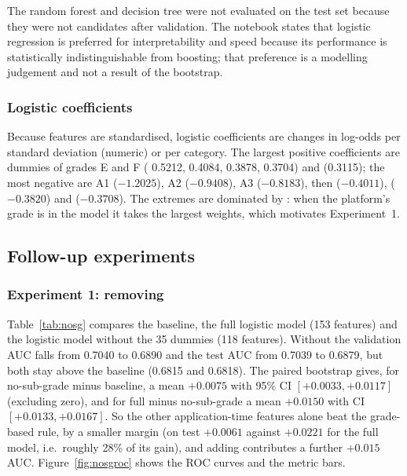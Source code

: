 The random forest and decision tree were not evaluated on the test set because they were not candidates after validation. The notebook states that logistic regression is preferred for interpretability and speed because its performance is statistically indistinguishable from boosting; that preference is a modelling judgement and not a result of the bootstrap.

\subsubsection{Logistic coefficients}

Because features are standardised, logistic coefficients are changes in log-odds per standard deviation (numeric) or per category. The largest positive coefficients are  dummies of grades E and F ( 0.5212,  0.4084,  0.3878,  0.3704) and  (0.3115); the most negative are  A1 ($-1.2025$), A2 ($-0.9408$), A3 ($-0.8183$), then  ($-0.4011$),  ($-0.3820$) and  ($-0.3708$). The extremes are dominated by : when the platform's grade is in the model it takes the largest weights, which motivates Experiment~1.

\subsection{Follow-up experiments}
\label{sec:res-exp}

\subsubsection{Experiment 1: removing }

Table~\ref{tab:nosg} compares the baseline, the full logistic model (153 features) and the logistic model without the 35  dummies (118 features). Without  the validation AUC falls from 0.7040 to 0.6890 and the test AUC from 0.7039 to 0.6879, but both stay above the baseline (0.6815 and 0.6818). The paired bootstrap gives, for no-sub-grade minus baseline, a mean $+0.0075$ with 95\% CI $[+0.0033,+0.0117]$ (excluding zero), and for full minus no-sub-grade a mean $+0.0150$ with CI $[+0.0133,+0.0167]$. So the other application-time features alone beat the grade-based rule, by a smaller margin (on test $+0.0061$ against $+0.0221$ for the full model, i.e.\ roughly 28\% of its gain), and adding  contributes a further $+0.015$ AUC. Figure~\ref{fig:nosgroc} shows the ROC curves and the metric bars.

